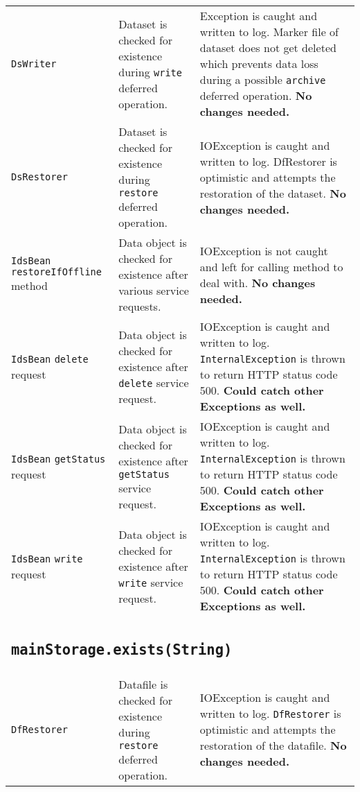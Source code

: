 \documentclass[paper=a4]{scrartcl}
\begin{document}
\begin{longtable}{ p{32mm} | p{48mm} | p{48mm} }
    \raggedright \texttt{DsWriter} &
    \raggedright Dataset is checked for existence during \texttt{write} deferred operation. &
    \raggedright Exception is caught and written to log. Marker file of dataset does not get deleted which prevents data loss during a possible \texttt{archive} deferred operation. \textbf{No changes needed.}
    \tabularnewline[4mm]
    \raggedright \texttt{DsRestorer} &
    \raggedright Dataset is checked for existence during \texttt{restore} deferred operation. &
    \raggedright IOException is caught and written to log. DfRestorer is optimistic and attempts the restoration of the dataset. \textbf{No changes needed.}
    \tabularnewline[4mm]
    \raggedright \texttt{IdsBean} \texttt{restoreIfOffline} method &
    \raggedright Data object is checked for existence after various service requests. &
    \raggedright IOException is not caught and left for calling method to deal with. \textbf{No changes needed.}
    \tabularnewline[4mm]
    \raggedright \texttt{IdsBean} \texttt{delete} request &
    \raggedright Data object is checked for existence after \texttt{delete} service request. &
    \raggedright IOException is caught and written to log. \texttt{InternalException} is thrown to return HTTP status code 500. \textbf{Could catch other Exceptions as well.}
    \tabularnewline[4mm]
    \raggedright \texttt{IdsBean} \texttt{getStatus} request &
    \raggedright Data object is checked for existence after \texttt{getStatus} service request. &
    \raggedright IOException is caught and written to log. \texttt{InternalException} is thrown to return HTTP status code 500. \textbf{Could catch other Exceptions as well.}
    \tabularnewline[4mm]
    \raggedright \texttt{IdsBean} \texttt{write} request &
    \raggedright Data object is checked for existence after \texttt{write} service request. &
    \raggedright IOException is caught and written to log. \texttt{InternalException} is thrown to return HTTP status code 500. \textbf{Could catch other Exceptions as well.}
    \tabularnewline

    \multicolumn{3}{p{\textwidth}}{
      \subsection{\texttt{mainStorage.exists(String)}}
    } \\

    \raggedright \texttt{DfRestorer} &
    \raggedright Datafile is checked for existence during \texttt{restore} deferred operation. &
    \raggedright IOException is caught and written to log. \texttt{DfRestorer} is optimistic and attempts the restoration of the datafile. \textbf{No changes needed.}
    \tabularnewline


\end{longtable}
\end{document}
